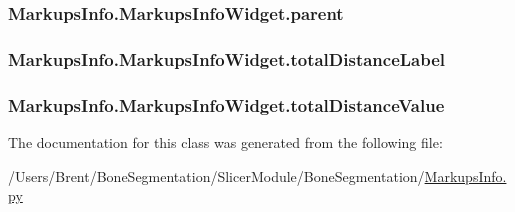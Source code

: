 \subsubsection[{parent}]{\setlength{\rightskip}{0pt plus 5cm}Markups\+Info.\+Markups\+Info\+Widget.\+parent}\label{class_markups_info_1_1_markups_info_widget_ad3681dfadf34f6b646e092e626c02269}
\hypertarget{class_markups_info_1_1_markups_info_widget_af5845a2231b4de465af8658e1e5039df}{}
\subsubsection[{total\+Distance\+Label}]{\setlength{\rightskip}{0pt plus 5cm}Markups\+Info.\+Markups\+Info\+Widget.\+total\+Distance\+Label}\label{class_markups_info_1_1_markups_info_widget_af5845a2231b4de465af8658e1e5039df}
\hypertarget{class_markups_info_1_1_markups_info_widget_ac2b547cb4aadcf3f29c37392d3f0d8b8}{}
\subsubsection[{total\+Distance\+Value}]{\setlength{\rightskip}{0pt plus 5cm}Markups\+Info.\+Markups\+Info\+Widget.\+total\+Distance\+Value}\label{class_markups_info_1_1_markups_info_widget_ac2b547cb4aadcf3f29c37392d3f0d8b8}


The documentation for this class was generated from the following file\+:\begin{DoxyCompactItemize}
\item 
/\+Users/\+Brent/\+Bone\+Segmentation/\+Slicer\+Module/\+Bone\+Segmentation/\hyperlink{_markups_info_8py}{Markups\+Info.\+py}\end{DoxyCompactItemize}
